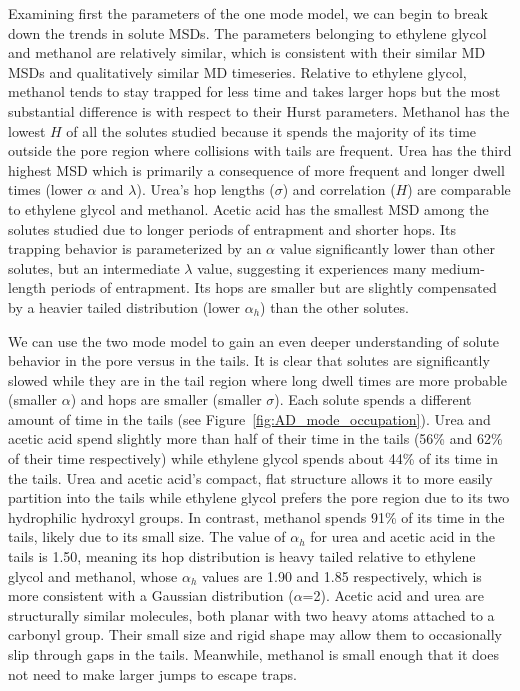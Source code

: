 \documentclass[journal=jctcce,manuscript=article]{achemso}
\begin{document}
  Examining first the parameters of the one mode model, we can begin to break
  down the trends in solute MSDs. The parameters belonging to ethylene glycol
  and methanol are relatively similar, which is consistent with their similar MD
  MSDs and qualitatively similar MD timeseries.
  Relative to ethylene glycol, methanol tends to stay trapped for less
  time and takes larger hops but the most substantial difference is with
  respect to their Hurst parameters. Methanol has the lowest $H$ of all the
  solutes studied because it spends the majority of its time outside the pore
  region where collisions with tails are frequent.
  Urea has the third highest MSD which is primarily a consequence of more
  frequent and longer dwell times (lower $\alpha$ and $\lambda$). Urea's hop
  lengths ($\sigma$) and correlation ($H$) are comparable to ethylene glycol
  and methanol. Acetic acid has the smallest MSD among the solutes studied due
  to longer periods of entrapment and shorter hops. Its trapping behavior is
  parameterized by an $\alpha$ value significantly lower than other solutes,
  but an intermediate $\lambda$ value, suggesting it experiences many
  medium-length periods of entrapment. Its hops are smaller but are slightly
  compensated by a heavier tailed distribution (lower $\alpha_h$) than the
  other solutes. 
  
  We can use the two mode model to gain an even deeper understanding of solute
  behavior in the pore versus in the tails. It is clear that solutes are
  significantly slowed while they are in the tail region where long dwell times
  are more probable (smaller $\alpha$) and hops are smaller (smaller $\sigma$).
  Each solute spends a different amount of time in the tails (see
  Figure~\ref{fig:AD_mode_occupation}). Urea and acetic acid spend slightly
  more than half of their time in the tails (56\% and 62\% of their time
  respectively) while ethylene glycol spends about 44\% of its time in the
  tails. Urea and acetic acid's compact, flat structure allows it to more
  easily partition into the tails while ethylene glycol prefers the pore region
  due to its two hydrophilic hydroxyl groups. In contrast, methanol spends 91\%
  of its time in the tails, likely due to its small size. The value of
  $\alpha_h$ for urea and acetic acid in the tails is 1.50, meaning its hop
  distribution is heavy tailed relative to ethylene glycol and methanol, whose
  $\alpha_h$ values are 1.90 and 1.85 respectively, which is more consistent
  with a Gaussian distribution ($\alpha$=2). Acetic acid and urea are
  structurally similar molecules, both planar with two heavy atoms attached to
  a carbonyl group. Their small size and rigid shape may allow them to
  occasionally slip through gaps in the tails. Meanwhile, methanol is small
  enough that it does not need to make larger jumps to escape traps.
\end{document}
